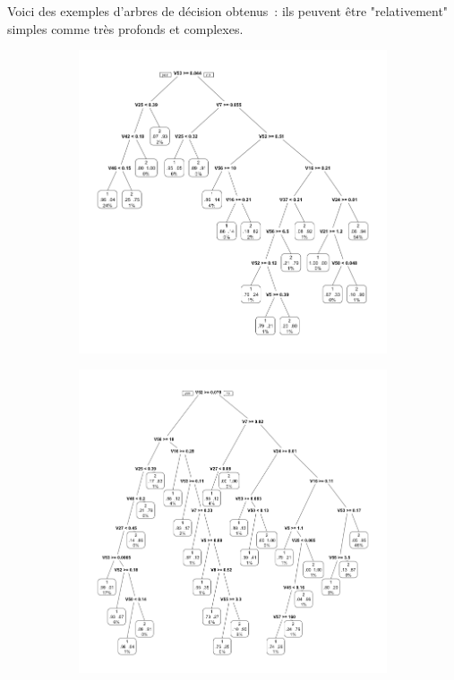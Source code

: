 \documentclass[a4paper,10pt]{report}
\begin{document}
Voici des exemples d'arbres de décision obtenus~: ils peuvent être "relativement" simples comme très profonds et complexes.
\begin{figure}[H]
	\centering
	\captionsetup{justification=centering, margin=2cm}
	\begin{subfigure}[b]{0.45\linewidth}
		\centering
		\captionsetup{justification=centering, margin=1cm}
		\includegraphics[width=1\linewidth]{img/3-2-decision-tree-spam-exp-1}
		\label{fig:arbre-decision-spam-simple}%
	\end{subfigure}%
	\begin{subfigure}[b]{0.45\linewidth}
		\centering
		\captionsetup{justification=centering, margin=1cm}
		\includegraphics[width=1\linewidth]{img/3-2-decision-tree-spam-exp-2}

\end{subfigure}
\end{figure}
\end{document}
